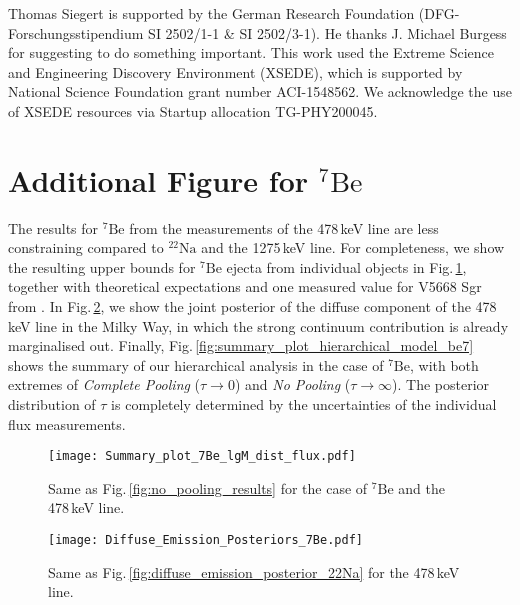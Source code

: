 \documentclass{aa}
\newcommand{\mrm}[1]{\mathrm{#1}}
\newcommand{\nuc}[2]{$\mrm{^{#2}#1}$}
\begin{document}
\begin{acknowledgements}
Thomas Siegert is supported by the German Research Foundation (DFG-Forschungsstipendium SI 2502/1-1 \& SI 2502/3-1). He thanks J. Michael Burgess for suggesting to do something important. This work used the Extreme Science and Engineering Discovery Environment (XSEDE), which is supported by National Science Foundation grant number ACI-1548562. We acknowledge the use of XSEDE resources via Startup allocation TG-PHY200045.
\end{acknowledgements}


\appendix

\section{Additional Figure for \nuc{Be}{7}}\label{sec:additional_figures_Be7}
%
The results for \nuc{Be}{7} from the measurements of the 478\,keV line are less constraining compared to \nuc{Na}{22} and the 1275\,keV line.
%
For completeness, we show the resulting upper bounds for \nuc{Be}{7} ejecta from individual objects in Fig.\,\ref{fig:no_pooling_results_7Be}, together with theoretical expectations \citep{Starrfield2020_COnovae} and one measured value for V5668 Sgr from \citet[][,M+16]{Molaro2016_V5668}.
%
In Fig.\,\ref{fig:diffuse_emission_posterior_7Be}, we show the joint posterior of the diffuse component of the 478\,keV line in the Milky Way, in which the strong continuum contribution is already marginalised out.
%
Finally, Fig.\,\ref{fig:summary_plot_hierarchical_model_be7} shows the summary of our hierarchical analysis in the case of \nuc{Be}{7}, with both extremes of \textit{Complete Pooling} ($\tau \rightarrow 0$) and \textit{No Pooling} ($\tau \rightarrow \infty$).
%
The posterior distribution of $\tau$ is completely determined by the uncertainties of the individual flux measurements.

\begin{figure}[!htbp]
	\centering
	\texttt{[image: Summary\_plot\_7Be\_lgM\_dist\_flux.pdf]}
	\caption{Same as Fig.\,\ref{fig:no_pooling_results} for the case of \nuc{Be}{7} and the 478\,keV line.}
	\label{fig:no_pooling_results_7Be}
\end{figure}

\begin{figure}[!hbtp]
	\centering
	\texttt{[image: Diffuse\_Emission\_Posteriors\_7Be.pdf]}
	\caption{Same as Fig.\,\ref{fig:diffuse_emission_posterior_22Na} for the 478\,keV line.}
	\label{fig:diffuse_emission_posterior_7Be}
\end{figure}
\end{document}
